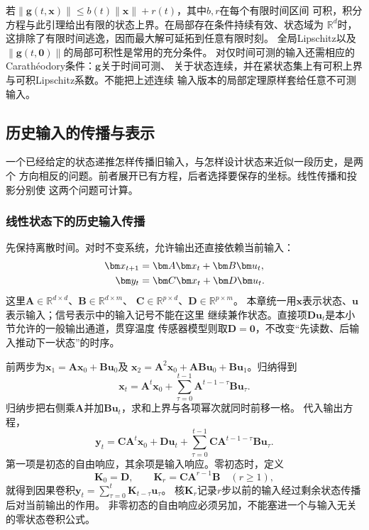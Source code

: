 若$\|\bm g(t,\bm x)\|\leq b(t)\|\bm x\|+r(t)$，其中$b,r$在每个有限时间区间
可积，积分方程与此引理给出有限的状态上界。在局部存在条件持续有效、状态域为
$\mathbb R^d$时，这排除了有限时间逃逸，因而最大解可延拓到任意有限时刻。
全局Lipschitz以及$\|\bm g(t,\bm0)\|$的局部可积性是常用的充分条件。
对仅时间可测的输入还需相应的Carathéodory条件：$\bm g$关于时间可测、
关于状态连续，并在紧状态集上有可积上界与可积Lipschitz系数。不能把上述连续
输入版本的局部定理原样套给任意不可测输入。

\subsection{历史输入的传播与表示}

一个已经给定的状态递推怎样传播旧输入，与怎样设计状态来近似一段历史，是两个
方向相反的问题。前者展开已有方程，后者选择要保存的坐标。线性传播和投影分别使
这两个问题可计算。

\subsubsection{线性状态下的历史输入传播}
\label{sec:signal-analysis-state-history-kernels}

先保持离散时间。对时不变系统，允许输出还直接依赖当前输入：
\begin{align}
  \bm x_{t+1}&=\bm A\bm x_t+\bm B\bm u_t,\notag\\
  \bm y_t&=\bm C\bm x_t+\bm D\bm u_t.
  \label{eq:signal-analysis-lti-state-space}
\end{align}
这里$\bm A\in\mathbb R^{d\times d}$、$\bm B\in\mathbb R^{d\times m}$、
$\bm C\in\mathbb R^{p\times d}$、$\bm D\in\mathbb R^{p\times m}$。
本章统一用$\bm x$表示状态、$\bm u$表示输入；信号表示中的输入记号不能在这里
继续兼作状态。直接项$\bm D\bm u_t$是本小节允许的一般输出通道，贯穿温度
传感器模型则取$\bm D=\bm0$，不改变“先读数、后输入推动下一状态”的时序。

前两步为$\bm x_1=\bm A\bm x_0+\bm B\bm u_0$及
$\bm x_2=\bm A^2\bm x_0+\bm A\bm B\bm u_0+\bm B\bm u_1$。归纳得到
\begin{equation}
  \bm x_t=\bm A^t\bm x_0+
    \sum_{\tau=0}^{t-1}\bm A^{t-1-\tau}\bm B\bm u_\tau.
  \label{eq:signal-analysis-state-unrolling}
\end{equation}
归纳步把右侧乘$\bm A$并加$\bm B\bm u_t$，求和上界与各项幂次就同时前移一格。
代入输出方程，
\begin{equation}
  \bm y_t=\bm C\bm A^t\bm x_0+\bm D\bm u_t+
    \sum_{\tau=0}^{t-1}\bm C\bm A^{t-1-\tau}\bm B\bm u_\tau.
  \label{eq:signal-analysis-state-convolution}
\end{equation}
第一项是初态的自由响应，其余项是输入响应。零初态时，定义
\begin{equation}
  \bm K_0=\bm D,\qquad
  \bm K_r=\bm C\bm A^{r-1}\bm B\quad(r\geq1),
  \label{eq:signal-analysis-state-kernel}
\end{equation}
就得到因果卷积$\bm y_t=\sum_{\tau=0}^t\bm K_{t-\tau}\bm u_\tau$。
核$\bm K_r$记录$r$步以前的输入经过剩余状态传播后对当前输出的作用。
非零初态的自由响应必须另加，不能塞进一个与输入无关的零状态卷积公式。

